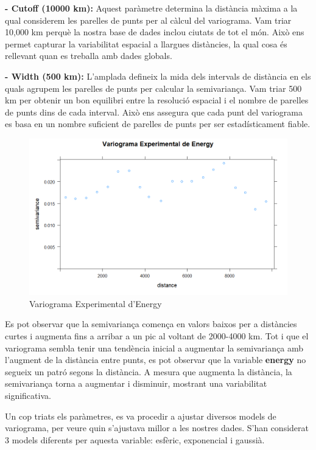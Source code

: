\textbf{- Cutoff (10000 km):} Aquest paràmetre determina la distància màxima a la qual considerem les parelles de punts per al càlcul del variograma. Vam triar 10,000 km perquè la nostra base de dades inclou ciutats de tot el món. Això ens permet capturar la variabilitat espacial a llargues distàncies, la qual cosa és rellevant quan es treballa amb dades globals.

\textbf{- Width (500 km):} L'amplada defineix la mida dels intervals de distància en els quals agrupem les parelles de punts per calcular la semivariança. Vam triar 500 km per obtenir un bon equilibri entre la resolució espacial i el nombre de parelles de punts dins de cada interval. Això ens assegura que cada punt del variograma es basa en un nombre suficient de parelles de punts per ser estadísticament fiable.

\begin{figure}
    \centering
    \includegraphics[width=0.75\linewidth]{variograma_experimental_energy.png}
    \caption{Variograma Experimental d'Energy}
    \label{fig:variograma_experimental_energy}
\end{figure}

Es pot observar que la semivariança comença en valors baixos per a distàncies curtes i augmenta fins a arribar a un pic al voltant de 2000-4000 km. Tot i que el variograma sembla tenir una tendència inicial a augmentar la semivariança amb l'augment de la distància entre punts, es pot observar que la variable \textbf{energy} no segueix un patró segons la distància. A mesura que augmenta la distància, la semivariança torna a augmentar i disminuir, mostrant una variabilitat significativa. 

Un cop triats els paràmetres, es va procedir a ajustar diversos models de variograma, per veure quin s'ajustava millor a les nostres dades. S'han considerat 3 models diferents per aquesta variable: esfèric, exponencial i gaussià.

